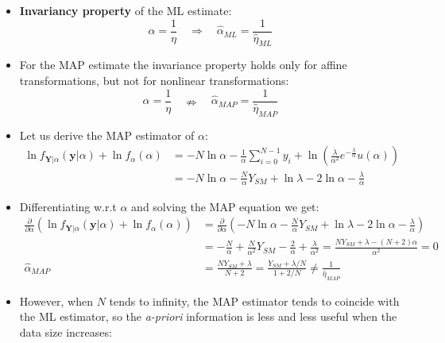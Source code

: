 \begin{itemize}
\begin{align*}
\frac{\partial \ln f_{\mathbf{Y}|\alpha}(\mathbf{y}|\alpha)}{\partial \alpha} &= - \frac{N}{\alpha} + \frac{1}{\alpha^2} \sum_{i=0}^{N-1} y_i = 0 \quad \Rightarrow \quad \hat{\alpha}_{ML} = \frac{1}{N} \sum_{i=0}^{N-1} y_i = Y_{SM} = \frac{1}{\hat{\eta}_{ML}}
\end{align*}
\item \textbf{Invariancy property} of the ML estimate:
\[
\alpha=\frac{1}{\eta}\quad\Rightarrow\quad\hat{\alpha}_{ML}=\frac{1}{\hat{\eta}_{ML}}
\]
\item For the MAP estimate the invariance property holds only for affine transformations, but not for nonlinear transformations:
\[
\alpha=\frac{1}{\eta}\quad \nRightarrow \quad\hat{\alpha}_{MAP}=\frac{1}{\hat{\eta}_{MAP}}
\]
\item Let us derive the MAP estimator of \(\alpha\):
\begin{align*}
\ln f_{\mathbf{Y}|\alpha}(\mathbf{y}|\alpha) + \ln f_\alpha(\alpha) &= -N \ln \alpha - \frac{1}{\alpha} \sum_{i=0}^{N-1} y_i + \ln \left( \frac{\lambda}{\alpha^2} e^{-\frac{\lambda}{\alpha}} u(\alpha) \right)\\[8pt]
&= -N \ln \alpha - \frac{N}{\alpha} Y_{SM} + \ln \lambda - 2 \ln \alpha - \frac{\lambda}{\alpha}
\end{align*}
\item Differentiating w.r.t \(\alpha\) and solving the MAP equation we get:
\begin{align*}
\frac{\partial}{\partial \alpha} \left( \ln f_{\mathbf{Y}|\alpha}(\mathbf{y}|\alpha) + \ln f_\alpha(\alpha) \right) &= \frac{\partial}{\partial \alpha} \left( -N \ln \alpha - \frac{N}{\alpha} Y_{SM} + \ln \lambda - 2 \ln \alpha - \frac{\lambda}{\alpha} \right) \\[10pt]
&= - \frac{N}{\alpha} + \frac{N}{\alpha^2} Y_{SM} - \frac{2}{\alpha} + \frac{\lambda}{\alpha^2} = \frac{N Y_{SM} + \lambda - (N + 2)\alpha}{\alpha^2} = 0 \\[10pt]
\hat{\alpha}_{MAP} &= \frac{N Y_{SM} + \lambda}{N + 2} = \frac{Y_{SM} + \lambda/N}{1 + 2/N} \neq \frac{1}{\hat{\eta}_{MAP}}
\end{align*}
\item However, when \(N\) tends to infinity, the MAP estimator tends to coincide with the ML estimator, so the \textit{a-priori} information is less and less useful when the data size increases:


\end{itemize}
